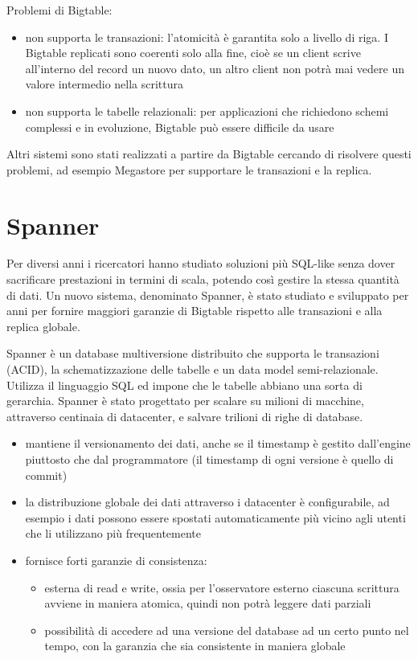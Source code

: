 Problemi di Bigtable:

\begin{itemize}
    \item non supporta le transazioni: l'atomicità è garantita solo a livello di riga. I Bigtable replicati sono coerenti solo alla fine, cioè se un client scrive all'interno del record un nuovo dato, un altro client non potrà mai vedere un valore intermedio nella scrittura
    \item non supporta le tabelle relazionali: per applicazioni che richiedono schemi complessi e in evoluzione, Bigtable può essere difficile da usare
\end{itemize}

Altri sistemi sono stati realizzati a partire da Bigtable cercando di risolvere questi problemi, ad esempio Megastore per supportare le transazioni e la replica.

\section{Spanner}

Per diversi anni i ricercatori hanno studiato soluzioni più SQL-like senza dover sacrificare prestazioni in termini di scala, potendo così gestire la stessa quantità di dati. Un nuovo sistema, denominato Spanner, è stato studiato e sviluppato per anni per fornire maggiori garanzie di Bigtable rispetto alle transazioni e alla replica globale. 

Spanner è un database multiversione distribuito che supporta le transazioni (ACID), la schematizzazione delle tabelle e un data model semi-relazionale. Utilizza il linguaggio SQL ed impone che le tabelle abbiano una sorta di gerarchia. Spanner è stato progettato per scalare su milioni di macchine, attraverso centinaia di datacenter, e salvare trilioni di righe di database.

\begin{itemize}
    \item mantiene il versionamento dei dati, anche se il timestamp è gestito dall'engine piuttosto che dal programmatore (il timestamp di ogni versione è quello di commit)
    \item la distribuzione globale dei dati attraverso i datacenter è configurabile, ad esempio i dati possono essere spostati automaticamente più vicino agli utenti che li utilizzano più frequentemente
    \item fornisce forti garanzie di consistenza:
    \begin{itemize}
        \item esterna di read e write, ossia per l'osservatore esterno ciascuna scrittura avviene in maniera atomica, quindi non potrà leggere dati parziali
        \item possibilità di accedere ad una versione del database ad un certo punto nel tempo, con la garanzia che sia consistente in maniera globale
    \end{itemize}
\end{itemize}

